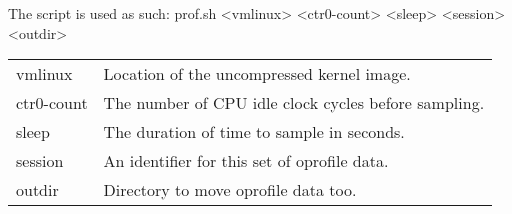 \documentclass{article}
\begin{document}
The script is used as such:
	prof.sh <vmlinux> <ctr0-count> <sleep> <session> <outdir> \\

\begin{tabular}[c]{ll}
vmlinux & Location of the uncompressed kernel image. \\
ctr0-count & The number of CPU idle clock cycles before sampling. \\
sleep & The duration of time to sample in seconds. \\
session & An identifier for this set of oprofile data. \\
outdir & Directory to move oprofile data too. \\
\end{tabular}
\end{document}
